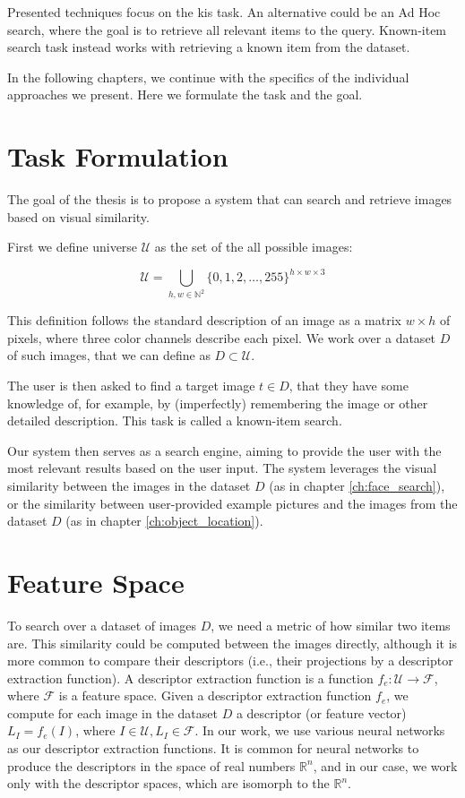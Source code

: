 Presented techniques focus on the \acrlong{kis} task. An alternative could be an Ad Hoc search, where the goal is to retrieve all relevant items to the query. Known-item search task instead works with retrieving a known item from the dataset.

In the following chapters, we continue with the specifics of the individual approaches we present. Here we formulate the task and the goal.


\section{Task Formulation}
\label{s:task_formulation_preliminaries}

The goal of the thesis is to propose a system that can search and retrieve images based on visual similarity.  

First we define universe $\mathcal{U}$ as the set of the all possible images:

$$
    \mathcal{U} = \bigcup_{h,w \in \mathbb{N}^2} \{0, 1, 2, \ldots, 255 \}^{h \times w \times 3}
$$

This definition follows the standard description of an image as a matrix $w \times h$ of pixels, where three color channels describe each pixel. We work over a dataset $D$ of such images, that we can define as $D \subset \mathcal{U}$.

The user is then asked to find a target image $t \in D$, that they have some knowledge of, for example, by (imperfectly) remembering the image or other detailed description. This task is called a known-item search.

Our system then serves as a search engine, aiming to provide the user with the most relevant results based on the user input. The system leverages the visual similarity between the images in the dataset $D$ (as in chapter \ref{ch:face_search}), or the similarity between user-provided example pictures and the images from the dataset $D$ (as in chapter \ref{ch:object_location}).

\section{Feature Space}

To search over a dataset of images $D$, we need a metric of how similar two items are. This similarity could be computed between the images directly, although it is more common to compare their descriptors (i.e., their projections by a descriptor extraction function). A descriptor extraction function is a function $f_e: \mathcal{U} \rightarrow \mathcal{F}$, where $\mathcal{F}$ is a feature space. Given a descriptor extraction function $f_e$, we compute for each image in the dataset $D$ a descriptor (or feature vector) $L_I = f_e(I)$, where $I \in \mathcal{U}, L_I \in \mathcal{F}$. In our work, we use various neural networks as our descriptor extraction functions. It is common for neural networks to produce the descriptors in the space of real numbers $\mathbb{R}^n$, and in our case, we work only with the descriptor spaces, which are isomorph to the $\mathbb{R}^n$.

